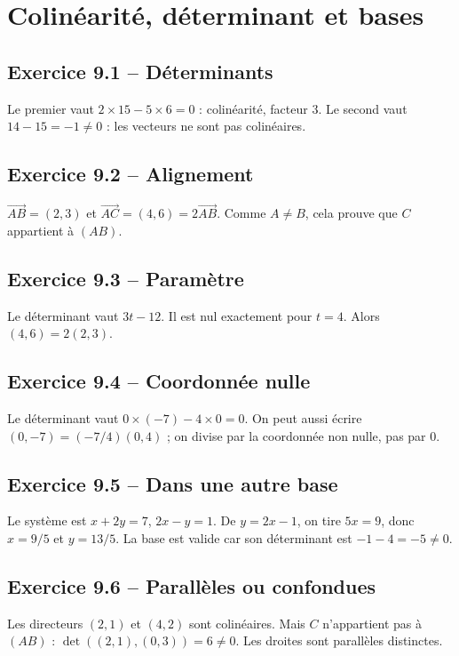 \chapter{Colinéarité, déterminant et bases}
\section*{Exercice 9.1 -- Déterminants}
Le premier vaut $2\times15-5\times6=0$ : colinéarité, facteur $3$. Le second vaut $14-15=-1\ne0$ : les vecteurs ne sont pas colinéaires.

\section*{Exercice 9.2 -- Alignement}
$\overrightarrow{AB}=(2,3)$ et $\overrightarrow{AC}=(4,6)=2\overrightarrow{AB}$. Comme $A\ne B$, cela prouve que $C$ appartient à $(AB)$.

\section*{Exercice 9.3 -- Paramètre}
Le déterminant vaut $3t-12$. Il est nul exactement pour $t=4$. Alors $(4,6)=2(2,3)$.

\section*{Exercice 9.4 -- Coordonnée nulle}
Le déterminant vaut $0\times(-7)-4\times0=0$. On peut aussi écrire $(0,-7)=(-7/4)(0,4)$ ; on divise par la coordonnée non nulle, pas par $0$.

\section*{Exercice 9.5 -- Dans une autre base}
Le système est $x+2y=7$, $2x-y=1$. De $y=2x-1$, on tire $5x=9$, donc $x=9/5$ et $y=13/5$. La base est valide car son déterminant est $-1-4=-5\ne0$.

\section*{Exercice 9.6 -- Parallèles ou confondues}
Les directeurs $(2,1)$ et $(4,2)$ sont colinéaires. Mais $C$ n'appartient pas à $(AB)$ : $\det((2,1),(0,3))=6\ne0$. Les droites sont parallèles distinctes.
